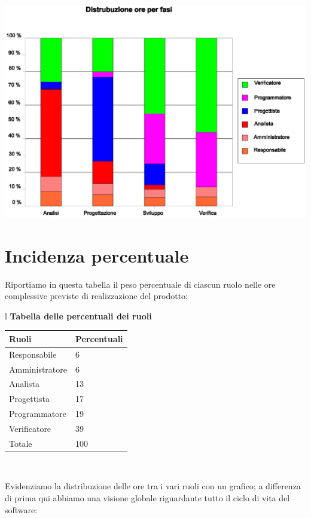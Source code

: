 \documentclass[11pt,titlepage,a4paper]{report}
\begin{document}
\begin{center}
\includegraphics[width=1\textwidth] {RuoliPerFasi.eps}
\end{center}


\section{Incidenza percentuale}
Riportiamo in questa tabella il peso percentuale di ciascun ruolo nelle ore
complessive previste di realizzazione del prodotto:
\begin{table}[hbtp]
\large{
\begin{tabular}{l}
\Large{\textbf{\textsf{Tabella delle percentuali dei ruoli}}} \\
\begin{tabular}{||p{6cm}||p{4cm}||}
\hline
\textbf{Ruoli} & \textbf{Percentuali}\\
\hline
{Responsabile}&6\\ 
\hline 
{Amministratore} &6\\ 
\hline
{Analista} &13 \\
\hline
{Progettista} &17\\
\hline
{Programmatore} &19\\
\hline
{Verificatore} &39 \\
\hline
{Totale} &100 \\
\hline
\end{tabular} \\
\end{tabular}
}
\end{table}

Evidenziamo la distribuzione delle ore tra i vari ruoli con un grafico; 
a differenza di prima qui abbiamo una visione globale riguardante 
tutto il ciclo di vita del software:
\end{document}
